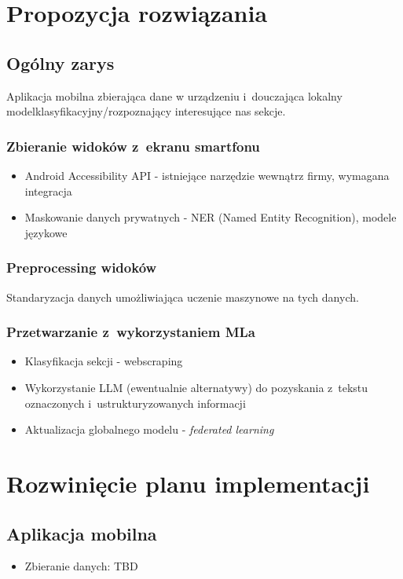 \documentclass[12pt]{article}
\begin{document}
\section*{Propozycja rozwiązania}
\subsection*{Ogólny zarys}
Aplikacja mobilna zbierająca dane w urządzeniu i~douczająca lokalny modelklasyfikacyjny/rozpoznający interesujące nas sekcje.

\subsubsection*{Zbieranie widoków z~ekranu smartfonu}
\begin{itemize}
    \item Android Accessibility API - istniejące narzędzie wewnątrz firmy, wymagana integracja
    \item Maskowanie danych prywatnych - NER (Named Entity Recognition), modele językowe
\end{itemize}

\subsubsection*{Preprocessing widoków}
Standaryzacja danych umożliwiająca uczenie maszynowe na tych danych.

\subsubsection*{Przetwarzanie z~wykorzystaniem MLa}
\begin{itemize}
    \item Klasyfikacja sekcji - webscraping
    \item Wykorzystanie LLM (ewentualnie alternatywy) do pozyskania z~tekstu oznaczonych i~ustrukturyzowanych informacji
    \item Aktualizacja globalnego modelu - \emph{federated learning}
\end{itemize}

\section*{Rozwinięcie planu implementacji}

\subsection*{Aplikacja mobilna}
\begin{itemize}
    \item Zbieranie danych: TBD
\end{itemize}
\end{document}
